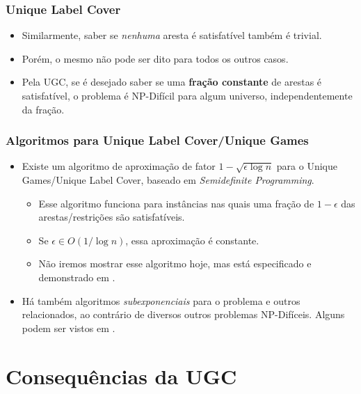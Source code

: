 \documentclass[11pt, handout]{beamer}
\newcommand{\np}{\ensuremath{\mathrm{NP}}\xspace}
\begin{document}
\begin{frame}[<+->]
    \frametitle{Unique Label Cover}
    \begin{itemize}
        \item Similarmente, saber se \emph{nenhuma} aresta é satisfatível também é trivial.
        \item Porém, o mesmo não pode ser dito para todos os outros casos.
        \item Pela UGC, se é desejado saber se uma \textbf{fração constante} de arestas é satisfatível, o problema é \np-Difícil para algum universo, independentemente da fração.   
        \end{itemize}
\end{frame}

\begin{frame}[<+->]
    \frametitle{Algoritmos para Unique Label Cover/Unique Games}
    \begin{itemize}
        \item Existe um algoritmo de aproximação de fator $1-\sqrt{\epsilon \log n}$ para o Unique Games/Unique Label Cover, baseado em \emph{Semidefinite Programming}. 
        \begin{itemize}
            \item Esse algoritmo funciona para instâncias nas quais uma fração de $1-\epsilon$ das arestas/restrições são satisfatíveis.
            \item Se $\epsilon \in O(1/\log n)$, essa aproximação é constante.
            \item Não iremos mostrar esse algoritmo hoje, mas está especificado e demonstrado em \cite{design_approx_algs}.
        \end{itemize}
        \item Há também algoritmos \emph{subexponenciais} para o problema e outros relacionados, ao contrário de diversos outros problemas \np-Difíceis. Alguns podem ser vistos em \cite{subexponential}.
    \end{itemize}
\end{frame}{}

\section{Consequências da UGC}
\end{document}
